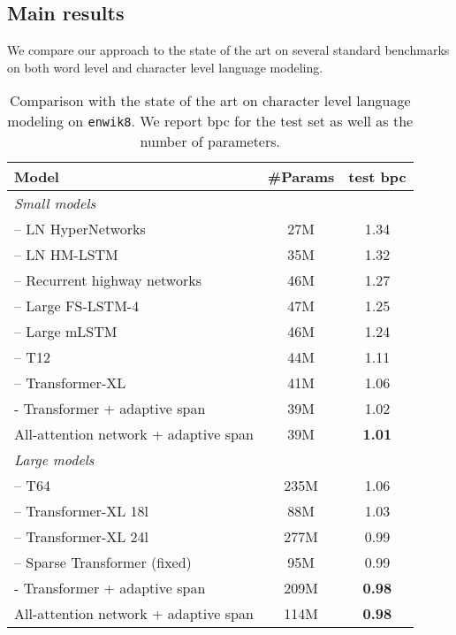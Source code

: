 \documentclass{article}
\begin{document}
\subsection{Main results}

We compare our approach to the state of the art on several standard benchmarks on both word level and character level language modeling.

\begin{table}[t]
\centering
\caption{
  Comparison with the state of the art on character level language modeling on \texttt{enwik8}.
  We report bpc for the test set as well as the number of parameters.
}
\label{tab:enwik8}
\begin{tabular}{lcc}
  \toprule
  Model & \#Params  & test bpc \\
  \midrule
  \multicolumn{3}{l}{\emph{Small models}}\\
  \citet{ha2016hypernetworks} – LN HyperNetworks & 27M  & 1.34\\
  \citet{chung2016hierarchical} – LN HM-LSTM & 35M   & 1.32\\
  \citet{zilly2017recurrent} – Recurrent highway networks & 46M  & 1.27\\
  \citet{mujika2017fast} – Large FS-LSTM-4 & 47M  &1.25\\
  \citet{krause2016multiplicative} – Large mLSTM & 46M  &1.24\\
  \citet{al2018character} – T12  & 44M &  1.11 \\
  \citet{dai2019transformer} – Transformer-XL  & 41M & 1.06 \\
  \citet{sukhbaatar2019adaptive} - Transformer + adaptive span  & 39M & 1.02 \\
  All-attention network + adaptive span & 39M & \bf 1.01 \\
  \midrule
  \multicolumn{3}{l}{\emph{Large models}}\\
  \citet{al2018character} – T64 & 235M & 1.06 \\
  \citet{dai2019transformer} – Transformer-XL 18l  & 88M & 1.03 \\
  \citet{dai2019transformer} – Transformer-XL 24l & 277M & 0.99 \\
  \citet{child2019generating} – Sparse Transformer (fixed) & 95M & 0.99 \\
  \citet{sukhbaatar2019adaptive} - Transformer + adaptive span  &  209M &  \bf 0.98 \\
  All-attention network + adaptive span & 114M & \bf 0.98 \\
  \bottomrule
\end{tabular}
\end{table}
\end{document}
